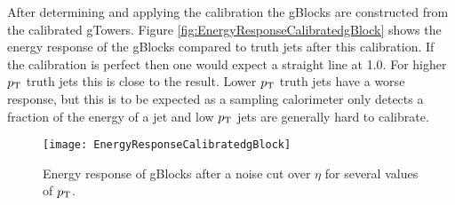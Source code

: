  After determining and applying the calibration the gBlocks are constructed from the calibrated gTowers.  Figure \ref{fig:EnergyResponseCalibratedgBlock} shows the energy response of the gBlocks compared to truth jets after this calibration.  If the calibration is perfect then one would expect a straight line at 1.0.  For higher $p_{\mathrm{T}}$ truth jets this is close to the result.  Lower $p_{\mathrm{T}}$ truth jets have a worse response, but this is to be expected as a sampling calorimeter only detects a fraction of the energy of a jet and low $p_{\mathrm{T}}$ jets are generally hard to calibrate.
 
  \begin{figure}[h!]
  \centering
	\texttt{[image: EnergyResponseCalibratedgBlock]}
\caption{\label{fig:gTowerEnergyResponseSlice}{Energy response of gBlocks after a noise cut over $\eta$ for several values of $p_{\mathrm{T}}$.}} 
\end{figure}
 
 










